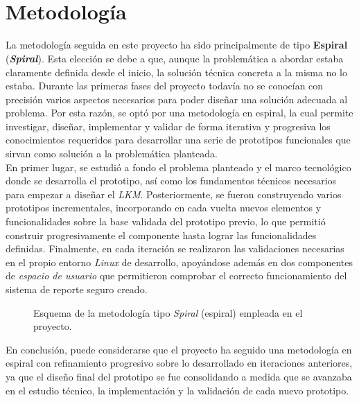 \

\

\section{Metodología}

La metodología seguida en este proyecto ha sido principalmente de tipo \textbf{Espiral} (\textbf{\textit{Spiral}}).
Esta elección se debe a que, aunque la problemática a abordar estaba claramente definida desde el inicio, la solución técnica concreta a la misma no lo estaba.
Durante las primeras fases del proyecto todavía no se conocían con precisión varios aspectos necesarios para poder diseñar una solución adecuada al problema.
Por esta razón, se optó por una metodología en espiral, la cual permite investigar, diseñar, implementar y validar de forma iterativa y progresiva los conocimientos requeridos para desarrollar una serie de prototipos funcionales que sirvan como solución a la problemática planteada.\\

En primer lugar, se estudió a fondo el problema planteado y el marco tecnológico donde se desarrolla el prototipo, así como los fundamentos técnicos necesarios para empezar a diseñar el \textit{LKM}.
Posteriormente, se fueron construyendo varios prototipos incrementales, incorporando en cada vuelta nuevos elementos y funcionalidades sobre la base validada del prototipo previo, lo que permitió construir progresivamente el componente hasta lograr las funcionalidades definidas.
Finalmente, en cada iteración se realizaron las validaciones necesarias en el propio entorno \textit{Linux} de desarrollo, apoyándose además en dos componentes de \textit{espacio de usuario} que permitieron comprobar el correcto funcionamiento del sistema de reporte seguro creado.\\

\begin{figure}[h!]
  \centering
  \scalebox{0.9}{}
  \caption{Esquema de la metodología tipo \textit{Spiral} (espiral) empleada en el proyecto.}
  \label{fig:methodology_progression}
\end{figure}

En conclusión, puede considerarse que el proyecto ha seguido una metodología en espiral con refinamiento progresivo sobre lo desarrollado en iteraciones anteriores, ya que el diseño final del prototipo se fue consolidando a medida que se avanzaba en el estudio técnico, la implementación y la validación de cada nuevo prototipo.

